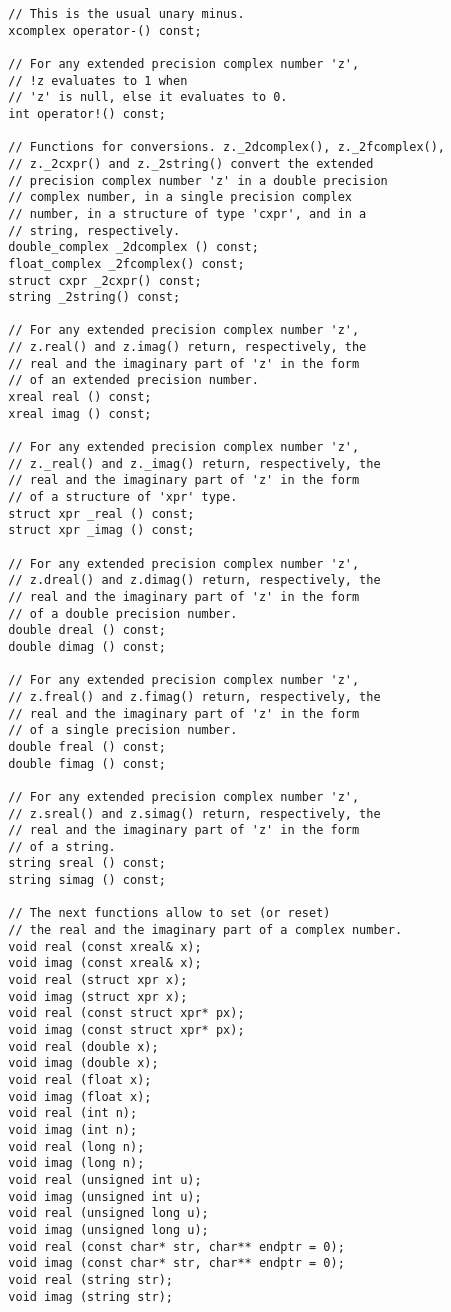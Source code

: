 \documentclass{article}
\begin{document}
\begin{verbatim}
  // This is the usual unary minus.
  xcomplex operator-() const;

  // For any extended precision complex number 'z', 
  // !z evaluates to 1 when
  // 'z' is null, else it evaluates to 0.
  int operator!() const;

  // Functions for conversions. z._2dcomplex(), z._2fcomplex(),
  // z._2cxpr() and z._2string() convert the extended
  // precision complex number 'z' in a double precision
  // complex number, in a single precision complex 
  // number, in a structure of type 'cxpr', and in a
  // string, respectively.
  double_complex _2dcomplex () const;
  float_complex _2fcomplex() const;
  struct cxpr _2cxpr() const;
  string _2string() const;

  // For any extended precision complex number 'z',
  // z.real() and z.imag() return, respectively, the
  // real and the imaginary part of 'z' in the form
  // of an extended precision number.
  xreal real () const;
  xreal imag () const;

  // For any extended precision complex number 'z',
  // z._real() and z._imag() return, respectively, the
  // real and the imaginary part of 'z' in the form
  // of a structure of 'xpr' type.
  struct xpr _real () const;
  struct xpr _imag () const;

  // For any extended precision complex number 'z',
  // z.dreal() and z.dimag() return, respectively, the
  // real and the imaginary part of 'z' in the form
  // of a double precision number.
  double dreal () const;
  double dimag () const;

  // For any extended precision complex number 'z',
  // z.freal() and z.fimag() return, respectively, the
  // real and the imaginary part of 'z' in the form
  // of a single precision number.
  double freal () const;
  double fimag () const;

  // For any extended precision complex number 'z',
  // z.sreal() and z.simag() return, respectively, the
  // real and the imaginary part of 'z' in the form
  // of a string.
  string sreal () const;
  string simag () const;
  
  // The next functions allow to set (or reset)
  // the real and the imaginary part of a complex number.
  void real (const xreal& x);
  void imag (const xreal& x);
  void real (struct xpr x);
  void imag (struct xpr x);
  void real (const struct xpr* px);
  void imag (const struct xpr* px);
  void real (double x);
  void imag (double x);
  void real (float x);
  void imag (float x);
  void real (int n);
  void imag (int n);
  void real (long n);
  void imag (long n);
  void real (unsigned int u);
  void imag (unsigned int u);
  void real (unsigned long u);
  void imag (unsigned long u);
  void real (const char* str, char** endptr = 0);
  void imag (const char* str, char** endptr = 0);
  void real (string str);
  void imag (string str);
  

\end{verbatim}
\end{document}
